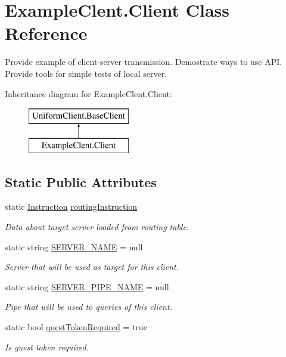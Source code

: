 \hypertarget{class_example_clent_1_1_client}{}\section{Example\+Clent.\+Client Class Reference}
\label{class_example_clent_1_1_client}


Provide example of client-\/server transmission. Demostrate ways to use A\+PI. Provide tools for simple tests of local server.  


Inheritance diagram for Example\+Clent.\+Client\+:\begin{figure}[H]
\begin{center}
\leavevmode
\includegraphics[height=2.000000cm]{d4/d9a/class_example_clent_1_1_client}
\end{center}
\end{figure}
\subsection*{Static Public Attributes}
\begin{DoxyCompactItemize}
\item 
static \mbox{\hyperlink{class_pipes_provider_1_1_networking_1_1_routing_1_1_instruction}{Instruction}} \mbox{\hyperlink{class_example_clent_1_1_client_aa0a70a66b460286c18cbb59d4798f8f3}{routing\+Instruction}}
\begin{DoxyCompactList}\small\item\em Data about target server loaded from routing table. \end{DoxyCompactList}\item 
static string \mbox{\hyperlink{class_example_clent_1_1_client_aa55c8c76b8164a59b15b8aec26c8bd89}{S\+E\+R\+V\+E\+R\+\_\+\+N\+A\+ME}} = null
\begin{DoxyCompactList}\small\item\em Server that will be used as target for this client. \end{DoxyCompactList}\item 
static string \mbox{\hyperlink{class_example_clent_1_1_client_ace39c387c6ea1cc5db66945775661ea6}{S\+E\+R\+V\+E\+R\+\_\+\+P\+I\+P\+E\+\_\+\+N\+A\+ME}} = null
\begin{DoxyCompactList}\small\item\em Pipe that will be used to queries of this client. \end{DoxyCompactList}\item 
static bool \mbox{\hyperlink{class_example_clent_1_1_client_ab504450de6cc737767a77f8f206a8d6f}{quest\+Token\+Required}} = true
\begin{DoxyCompactList}\small\item\em Is guest token required. \end{DoxyCompactList}\end{DoxyCompactItemize}
